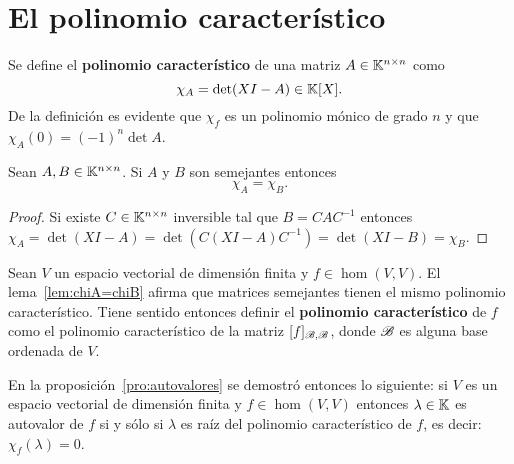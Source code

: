 \section{El polinomio característico}

%

\begin{block}
    Se define el \textbf{polinomio característico} de una matriz
    $A\in\mathbb{K}^{n\times n}$ como
    \[
        \chi_A=\det(XI-A)\in\mathbb{K}[X].
    \]
    De la definición es evidente que $\chi_f$ es un polinomio mónico de grado
    $n$ y que $\chi_A(0)=(-1)^n\det A$. 
\end{block}

\begin{lem}
    \label{lem:chiA=chiB}
    Sean $A,B\in\mathbb{K}^{n\times n}$. Si $A$ y $B$ son semejantes entonces
    \[
		\chi_A=\chi_B. 
	\]

    \begin{proof}
		Si existe $C\in\mathbb{K}^{n\times n}$ inversible tal que $B=CAC^{-1}$ entonces
		$\chi_A=\det(XI-A)=\det(C(XI-A)C^{-1})=\det(XI-B)=\chi_B$.
    \end{proof}
\end{lem}

\begin{block}
    Sean $V$ un espacio vectorial de dimensión finita y $f\in\hom(V,V)$.  El
    lema~\ref{lem:chiA=chiB} afirma que matrices semejantes tienen el mismo
    polinomio característico. Tiene sentido entonces definir el
    \textbf{polinomio característico} de $f$ como el polinomio característico
    de la matriz $[f]_{\mathscr{B},\mathscr{B}}$, donde $\mathscr{B}$ es alguna base ordenada de $V$. 
\end{block}

\begin{remark}
	En la proposición~\ref{pro:autovalores} se demostró entonces lo siguiente:
	si $V$ es un espacio vectorial de dimensión finita y $f\in\hom(V,V)$
	entonces $\lambda\in\mathbb{K}$ es autovalor de $f$ si y sólo si $\lambda$ es raíz
	del polinomio característico de $f$, es decir: $\chi_f(\lambda)=0$.
\end{remark}

